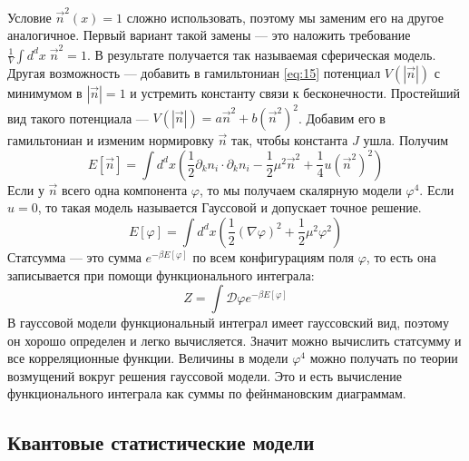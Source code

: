 \documentclass[a4paper,12pt]{article}
\theoremstyle{definition}
\theoremstyle{definition}
\theoremstyle{definition}
\begin{document}
Условие $\vec n^2(x)=1$ сложно использовать, поэтому мы заменим его на другое аналогичное. Первый
вариант такой замены --- это наложить требование $\frac{1}{V}\int d^dx\; \vec n^2=1$. В результате
получается так называемая сферическая модель. Другая возможность --- добавить в гамильтониан
\eqref{eq:15} потенциал $V(\left|\vec n\right|)$ с минимумом в $\left|\vec n\right|=1$ и устремить
константу связи к бесконечности. Простейший вид такого потенциала --- $V(\left|\vec n\right|)=a\vec
n^2+b\left(\vec n^2\right)^2$. Добавим его в гамильтониан и изменим нормировку $\vec n$ так, чтобы
константа $J$ ушла. Получим
\begin{equation}
  \label{eq:16}
  E[\vec n]=\int d^d x \left(\frac{1}{2}\partial_k n_i\cdot \partial_k n_i-\frac{1}{2}\mu^2 \vec n^2+\frac{1}{4}u\left(\vec n^2\right)^2\right)
\end{equation}
Если у $\vec n$ всего одна компонента $\varphi$, то мы получаем скалярную модели $\varphi^4$. Если
$u=0$, то такая модель называется Гауссовой и допускает точное решение. 
\begin{equation}
  \label{eq:17}
  E[\varphi]=\int d^d x (\frac{1}{2}(\nabla \varphi)^2+\frac{1}{2}\mu^2 \varphi^2)
\end{equation}
Статсумма --- это сумма $e^{-\beta E[\varphi]}$ по всем конфигурациям поля $\varphi$, то есть она
записывается при помощи функционального интеграла: 
\begin{equation}
  \label{eq:18}
  Z=\int \mathcal{D}\varphi e^{-\beta E[\varphi]}
\end{equation}
В гауссовой модели функциональный интеграл имеет гауссовский вид, поэтому он хорошо определен и
легко вычисляется. Значит можно вычислить статсумму и все корреляционные функции. Величины в модели
$\varphi^4$ можно получать по теории возмущений вокруг решения гауссовой модели. Это и есть
вычисление функционального интеграла как суммы по фейнмановским диаграммам.  

\subsection*{Квантовые статистические модели}
\label{sec:quantum-statistical-models}
\end{document}
